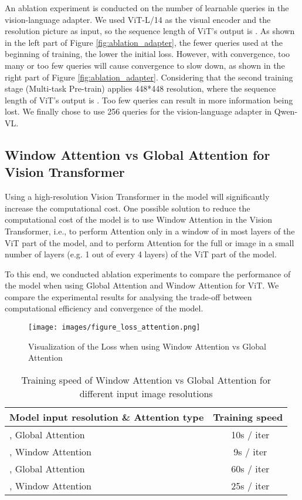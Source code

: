 \documentclass{article}
\newcommand{\tablestyle}[2]{\setlength{\tabcolsep}{#1}\renewcommand{\arraystretch}{#2}\centering\footnotesize}
\begin{document}
An ablation experiment is conducted on the number of learnable queries in the vision-language adapter. We used ViT-L/14 as the visual encoder and the  resolution picture as input, so the sequence length of ViT's output is . As shown in the left part of Figure \ref{fig:ablation_adapter}, the fewer queries used at the beginning of training, the lower the initial loss. However, with convergence, too many or too few queries will cause convergence to slow down, as shown in the right part of Figure \ref{fig:ablation_adapter}. Considering that the second training stage (Multi-task Pre-train) applies 448*448 resolution, where the sequence length of ViT's output is . Too few queries can result in more information being lost. We finally chose to use 256 queries for the vision-language adapter in Qwen-VL.

\subsection{Window Attention vs Global Attention for Vision Transformer}
\label{app:window_attention}

Using a high-resolution Vision Transformer in the model will significantly increase the computational cost. One possible solution to reduce the computational cost of the model is to use Window Attention in the Vision Transformer, i.e., to perform Attention only in a window of  in most layers of the ViT part of the model, and to perform Attention for the full  or  image in a small number of layers (e.g. 1 out of every 4 layers) of the ViT part of the model.

To this end, we conducted ablation experiments to compare the performance of the model when using Global Attention and Window Attention for ViT. We compare the experimental results for analysing the trade-off between computational efficiency and convergence of the model.

\begin{figure*}[ht]
\centering
\texttt{[image: images/figure\_loss\_attention.png]}
   \caption{Visualization of the Loss when using Window Attention vs Global Attention}
\label{fig:ablation_attention}
\end{figure*}

\begin{table}[htbp]
    \centering
    \tablestyle{7pt}{1.3}
    \caption{Training speed of Window Attention vs Global Attention for different input image resolutions}
    \begin{tabular}{l c}
         \toprule
         Model input resolution \& Attention type            & Training speed  \\
         \midrule
         , Global Attention        & ~10s / iter \\
         , Window Attention            & ~9s / iter \\
         , Global Attention      & ~60s / iter \\
         , Window Attention       & ~25s / iter \\
         \bottomrule
    \end{tabular}
    \label{tab:ablation_attention}
\end{table}
\end{document}
